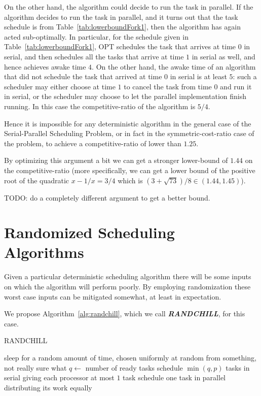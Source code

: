 \documentclass[twocolumn]{article}[11pt]
\newcommand{\defn}[1]{{\textit{\textbf{\boldmath #1}}}\xspace}
\begin{document}
On the other hand, the algorithm could decide to run the task in
parallel. If the algorithm decides to run the task in parallel,
and it turns out that the task schedule is from
Table~\ref{tab:lowerboundFork1}, then the algorithm has again
acted sub-optimally. In particular, for the schedule given in
Table~\ref{tab:lowerboundFork1}, OPT schedules the task that
arrives at time $0$ in serial, and then schedules all the tasks
that arrive at time $1$ in serial as well, and hence achieves
awake time $4$. On the other hand, the awake time of an algorithm
that did not schedule the task that arrived at time $0$ in
serial is at least $5$: such a scheduler may either choose at
time $1$ to cancel the task from time $0$ and run it in serial,
or the scheduler may choose to let the parallel implementation
finish running. In this case the competitive-ratio of the
algorithm is $5/4$.

Hence it is impossible for any deterministic algorithm in the
general case of the Serial-Parallel Scheduling Problem, or in
fact in the symmetric-cost-ratio case of the problem, to achieve
a competitive-ratio of lower than $1.25$.

By optimizing this argument a bit we can get a stronger
lower-bound of $1.44$ on the competitive-ratio (more
specifically, we can get a lower bound of the positive root of
the quadratic $x - 1/x = 3/4$ which is $(3+\sqrt{73})/8 \in
(1.44, 1.45)$).

{\color{red} TODO: do a completely different argument to get a
better bound. }

\section{Randomized Scheduling Algorithms}
Given a particular deterministic scheduling algorithm there will
be some inputs on which the algorithm will perform poorly. 
By employing randomization these worst case inputs can be
mitigated somewhat, at least in expectation.

We propose Algorithm~\ref{alg:randchill}, which we call
\defn{RANDCHILL}, for this case.

\begin{algorithm}
  \caption{RANDCHILL}
  \label{alg:randchill}
  \begin{algorithmic}
        \State sleep for a random amount of time, chosen
        uniformly at random from something, not really sure what 
        \State $q \gets $ number of ready tasks
          \State schedule $\min(q, p)$ tasks in serial
          \State giving each processor at most $1$ task
        \Else
          \State schedule one task in parallel
          \State distributing its work equally 
        \EndIf
      \EndIf
    \EndWhile
  \end{algorithmic}
\end{algorithm}
\end{document}
